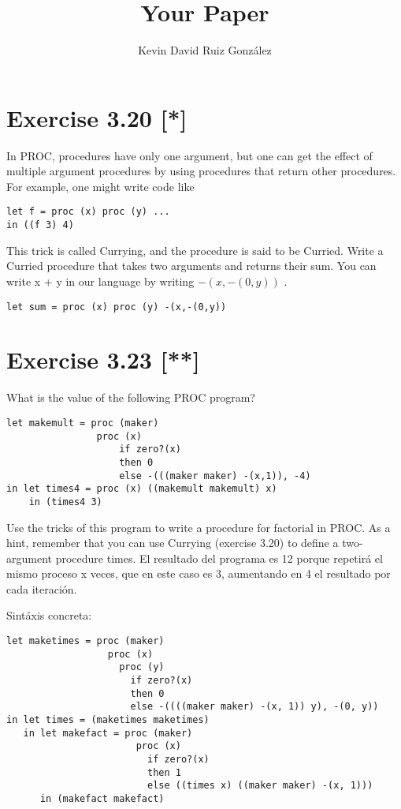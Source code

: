 \documentclass{article}
\title{Your Paper}
\author{Kevin David Ruiz González}
\begin{document}
\maketitle

\section{Exercise 3.20 [*] }
In PROC, procedures have only one argument, but one can get the effect of multiple argument procedures by using procedures that return other procedures. For example, one might write code like

\begin{Verbatim}
let f = proc (x) proc (y) ...
in ((f 3) 4) 
\end{Verbatim}
This trick is called Currying, and the procedure is said to be Curried. Write a Curried procedure that takes two arguments and returns their sum. You can write x + y in our language by writing $-(x,-(0,y))$ .
\begin{Verbatim}
let sum = proc (x) proc (y) -(x,-(0,y))
\end{Verbatim}


\section{Exercise 3.23 [**] }
What is the value of the following PROC program?
\begin{Verbatim}
let makemult = proc (maker)
                proc (x)
                    if zero?(x)
                    then 0
                    else -(((maker maker) -(x,1)), -4)
in let times4 = proc (x) ((makemult makemult) x)
    in (times4 3)
\end{Verbatim}
Use the tricks of this program to write a procedure for factorial in PROC. As a hint,
remember that you can use Currying (exercise 3.20) to define a two-argument procedure times.
El resultado del programa es 12 porque repetirá el mismo proceso x veces, que en este caso es 3, aumentando en 4 el resultado por cada iteración. 

Sintáxis concreta:
\begin{Verbatim}
let maketimes = proc (maker)
                  proc (x)
                    proc (y)
                      if zero?(x)
                      then 0
                      else -((((maker maker) -(x, 1)) y), -(0, y))
in let times = (maketimes maketimes)
   in let makefact = proc (maker)
                       proc (x)
                         if zero?(x)
                         then 1
                         else ((times x) ((maker maker) -(x, 1)))
      in (makefact makefact)
\end{Verbatim}
\end{document}
